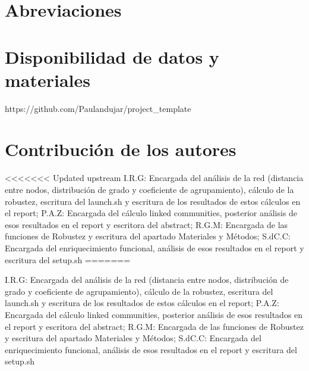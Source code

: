 \documentclass{bmcart}
\begin{document}
	
	
	
	
	
	
	
	
	
	
	\begin{backmatter}
	
		\section*{Abreviaciones}%
			
		
		\section*{Disponibilidad de datos y materiales}%
			https://github.com/Paulandujar/project\_template
		
		\section*{Contribución de los autores}
<<<<<<< Updated upstream
			I.R.G: Encargada del análisis de la red (distancia entre nodos, distribución de grado y coeficiente de agrupamiento), cálculo de la robustez, escritura del launch.sh y escritura de los resultados de estos cálculos en el report; P.A.Z: Encargada del cálculo linked communities, posterior análisis de esos resultados en el report y escritora del abstract; R.G.M: Encargada de las funciones de Robustez y escritura del apartado Materiales y Métodos; S.dC.C: Encargada del enriquecimiento funcional, análisis de esos resultados en el report y escritura del setup.sh 
=======
		
			I.R.G: Encargada del análisis de la red (distancia entre nodos, distribución de grado y coeficiente de agrupamiento), cálculo de la robustez, escritura del launch.sh y escritura de los resultados de estos cálculos en el report; P.A.Z: Encargada del cálculo linked communities, posterior análisis de esos resultados en el report y escritora del abstract; R.G.M: Encargada de las funciones de Robustez y escritura del apartado Materiales y Métodos; S.dC.C: Encargada del enriquecimiento funcional, análisis de esos resultados en el report y escritura del setup.sh
		

\end{backmatter}
\end{document}
